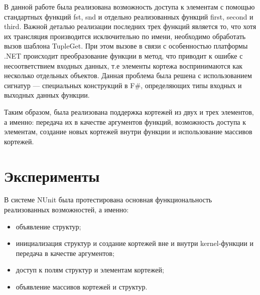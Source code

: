 \documentclass[14pt]{matmex-diploma}
\begin{document}
В данной работе была реализована возможность доступа к элементам с помощью стандартных функций fst, snd и отдельно реализованных функций first, second и third. Важной деталью реализации последних трех функций является то, что хотя их трансляция производится исключительно по имени, необходимо обработать вызов шаблона TupleGet. При этом вызове в связи с особенностью платформы .NET происходит преобразование функции в метод, что приводит к ошибке с несоответствием входных данных, т.е элементы кортежа воспринимаются как несколько отдельных объектов. Данная проблема была решена с использованием сигнатур — специальных конструкций в F\#, определяющих типы входных и выходных данных функции.

Таким образом, была реализована поддержка кортежей из двух и трех элементов, а именно: передача их в качестве аргументов функций, возможность доступа к элементам, создание новых кортежей внутри функции и использование массивов кортежей.

\section {Эксперименты}
В системе NUnit была протестирована основная функциональность реализованных возможностей, а именно:
\begin{itemize}
\item объявление структур;
\item инициализация структур и создание кортежей вне и внутри kernel-функции и передача в качестве аргументов;
\item доступ к полям структур и элементам кортежей;
\item объявление массивов кортежей и структур.
\end{itemize}

\end{document}
